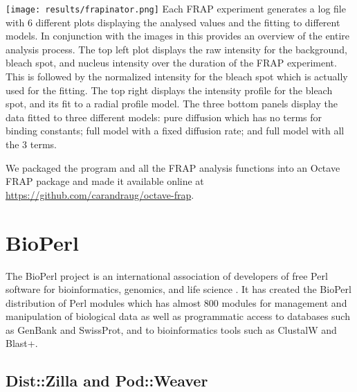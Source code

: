 \begin{sidewaysfigure}
  \texttt{[image: results/frapinator.png]}
               {Each FRAP experiment generates a log file with 6
                 different plots displaying the analysed values and
                 the fitting to different models.  In conjunction with
                 the images in  this
                 provides an overview of the entire analysis
                 process.  The top left plot displays the raw
                 intensity for the background, bleach spot, and
                 nucleus intensity over the duration of the FRAP
                 experiment. This is followed by the normalized
                 intensity for the bleach spot which is actually used
                 for the fitting. The top right displays the intensity
                 profile for the bleach spot, and its fit to a radial
                 profile model. The three bottom panels display the
                 data fitted to three different models: pure diffusion
                 which has no terms for binding constants; full model
                 with a fixed diffusion rate; and full model with all
                 the 3 terms.  }
               \label{fig:software:frapinator}
\end{sidewaysfigure}

We packaged the  program and all the FRAP analysis
functions into an Octave FRAP package and made it available
online at \url{https://github.com/carandraug/octave-frap}.

\section{BioPerl}

The BioPerl project is an international association of developers of
free Perl software for bioinformatics, genomics, and life science
\citep{bioperl}.  It has created the BioPerl distribution of Perl
modules which has almost 800 modules for management and manipulation
of biological data as well as programmatic access to databases such as GenBank
and SwissProt, and to bioinformatics tools such as ClustalW and Blast+.


\subsection{Dist::Zilla and Pod::Weaver}

